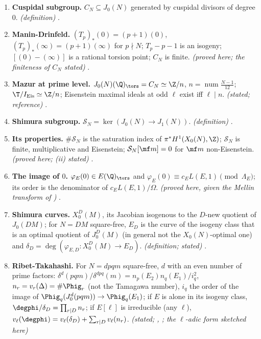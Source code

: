 \begin{enumerate}[label=\textbf{\thechapter.\arabic*}]
{multiplicity one)} .
\item \textbf{Cuspidal subgroup.} $C_N\subseteq J_0(N)$ generated by cuspidal divisors of degree $0$. \emph{(definition)} .
\item \textbf{Manin-Drinfeld.} $(T_p)_*(0)=(p+1)(0)$, $(T_p)_*(\infty)=(p+1)(\infty)$ for $p\nmid N$; $T_p-p-1$ is an isogeny; $[(0)-(\infty)]$ is a rational torsion point; $C_N$ is finite. \emph{(proved here; the
finiteness of $C_N$ stated)} .
\item \textbf{Mazur at prime level.} $J_0(N)(\Q)_{\tors}=C_N\simeq\Z/n$, $n=\operatorname{num}\frac{N-1}{12}$; $\T/I_{\mathrm{Eis}}\simeq\Z/n$; Eisenstein maximal ideals at odd $\ell$ exist iff $\ell\mid n$. \emph{(stated; reference)}
.
\item \textbf{Shimura subgroup.} $\mathcal S_N=\ker(J_0(N)\to J_1(N))$. \emph{(definition)} .
\item \textbf{Its properties.} $\#\mathcal S_N$ is the saturation index of $\pi^*H^1(X_0(N),\Z)$; $\mathcal S_N$ is finite, multiplicative and Eisenstein; $\mathcal S_N[\mf m]=0$ for $\mf m$ non-Eisenstein. \emph{(proved here; (ii)
stated)} .
\item \textbf{The image of $0$.} $\varphi_E(0)\in E(\Q)_{\tors}$ and $\varphi_E(0)\equiv c_EL(E,1)\pmod{\Lambda_E}$; its order is the denominator of $c_EL(E,1)/\Omega$. \emph{(proved here, given the Mellin transform of
)} .
\item \textbf{Shimura curves.} $X_0^D(M)$, its Jacobian isogenous to the $D$-new quotient of $J_0(DM)$; for $N=DM$ square-free, $E_D$ is the curve of the isogeny class that is an optimal quotient of $J_0^D(M)$ (in general not the $X_0(N)$-optimal one) and
$\delta_D=\deg(\varphi_{E,D}\colon X_0^D(M)\to E_D)$. \emph{(definition; stated)} .
\item \textbf{Ribet-Takahashi.} For $N=dpqm$ square-free, $d$ with an even number of prime factors: $\delta^d(pqm)/\delta^{dpq}(m)=n_p(E_2)n_q(E_1)/i_q^2$, $n_r=v_r(\Delta)=\#\Phig_r$ (not the Tamagawa
number), $i_q$ the order of the image of $\Phig_q(J_0^d(pqm))\to\Phig_q(E_1)$; if $E$ is alone in its isogeny class, $\degphi/\delta_D=\prod_{r\mid D}n_r$; if $E[\ell]$ is irreducible (any $\ell$),
$v_\ell(\degphi)=v_\ell(\delta_D)+\sum_{r\mid D}v_\ell(n_r)$. \emph{(stated; \cite[Theorems 1, 2]{RibetTakahashi97}, \cite[Theorem 3.2, Corollary 3.5]{Takahashi01}; the $\ell$-adic form sketched here)}

\end{enumerate}
